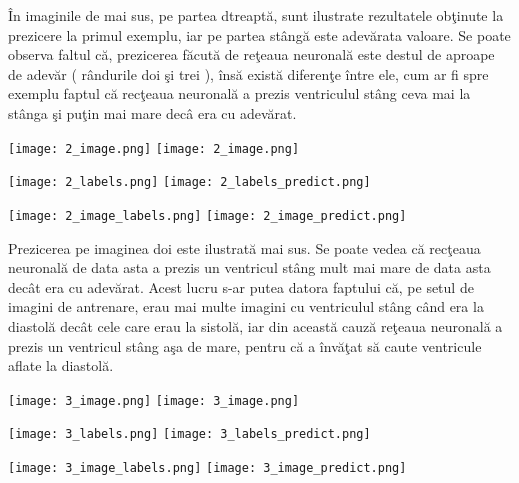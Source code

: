 \^{I}n imaginile de mai sus, pe partea dtreapt\u{a}, sunt ilustrate rezultatele ob\c{t}inute la prezicere la primul exemplu, iar pe partea st\^{a}ng\u{a} este adev\u{a}rata valoare. Se poate observa faltul c\u{a}, prezicerea f\u{a}cut\u{a} de re\c{t}eaua neuronal\u{a} este destul de aproape de adev\u{a}r ( r\^{a}ndurile doi \c{s}i trei ), \^{i}ns\u{a} exist\u{a} diferen\c{t}e \^{i}ntre ele, cum ar fi spre exemplu faptul c\u{a} rec\c{t}eaua neuronal\u{a} a prezis ventriculul st\^{a}ng ceva mai la st\^{a}nga \c{s}i pu\c{t}in mai mare dec\^{a} era cu adev\u{a}rat.

\begin{center}
\texttt{[image: 2\_image.png]}
\texttt{[image: 2\_image.png]}
\end{center}

\begin{center}
\texttt{[image: 2\_labels.png]}
\texttt{[image: 2\_labels\_predict.png]}
\end{center}

\begin{center}
\texttt{[image: 2\_image\_labels.png]}
\texttt{[image: 2\_image\_predict.png]}
\end{center}

Prezicerea pe imaginea doi este ilustrat\u{a} mai sus. Se poate vedea c\u{a} rec\c{t}eaua neuronal\u{a} de data asta a prezis un ventricul st\^{a}ng mult mai mare de data asta dec\^{a}t era cu adev\u{a}rat. Acest lucru s-ar putea datora faptului c\u{a}, pe setul de imagini de antrenare, erau mai multe imagini cu ventriculul st\^{a}ng c\^{a}nd era la diastol\u{a} dec\^{a}t cele care erau la sistol\u{a}, iar din aceast\u{a} cauz\u{a} re\c{t}eaua neuronal\u{a} a prezis un ventricul st\^{a}ng a\c{s}a de mare, pentru c\u{a} a \^{i}nv\u{a}\c{t}at s\u{a} caute ventricule aflate la diastol\u{a}.

\begin{center}
\texttt{[image: 3\_image.png]}
\texttt{[image: 3\_image.png]}
\end{center}

\begin{center}
\texttt{[image: 3\_labels.png]}
\texttt{[image: 3\_labels\_predict.png]}
\end{center}

\begin{center}
\texttt{[image: 3\_image\_labels.png]}
\texttt{[image: 3\_image\_predict.png]}
\end{center}

